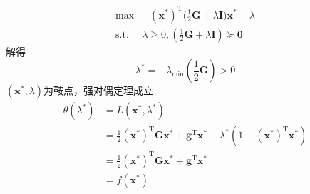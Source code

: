 \begin{example}
\begin{solution}
\[\begin{array}{rl}
                \max & -(\boldsymbol{x}^{*})^{\mathrm{T}}\Big(\frac{1}{2}\boldsymbol{G}+\lambda\boldsymbol{I}\Big)\boldsymbol{x}^{*}-\lambda\\
                \mathrm{s.t.} & \lambda\geqslant 0,(\frac{1}{2}\boldsymbol{G}+\lambda\boldsymbol{I})\succcurlyeq \boldsymbol{0}
            \end{array}
        \]
        解得
        \[
            \lambda^* = -\lambda_{\min}(\dfrac{1}{2}\boldsymbol{G})>0
        \]
        $(\boldsymbol{x}^*,\lambda)$为鞍点，强对偶定理成立
        \[
            \begin{aligned}
                \theta(\lambda^{*})&=L(\boldsymbol{x}^{*},\lambda^{*})\\
                &=\frac12(\boldsymbol{x}^*)^\mathrm{T}\boldsymbol{G}\boldsymbol{x}^*+\boldsymbol{g}^\mathrm{T}\boldsymbol{x}^*-\lambda^*(1-(\boldsymbol{x}^*)^\mathrm{T}\boldsymbol{x}^*)\\
                &=\frac12(\boldsymbol{x}^*)^\mathrm{T}\boldsymbol{G}\boldsymbol{x}^*+\boldsymbol{g}^\mathrm{T}\boldsymbol{x}^*\\
                &=f(\boldsymbol{x}^*)
            \end{aligned}   
        \]
    \end{solution}
\end{example}
